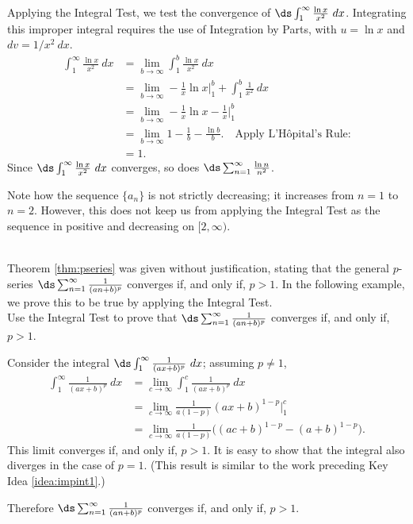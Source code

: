 {Applying the Integral Test, we test the convergence of $\ds \int_1^\infty \frac{\ln x}{x^2}\ dx$. Integrating this improper integral requires the use of Integration by Parts, with $u = \ln x$ and $dv = 1/x^2\ dx$. 
\begin{align*}
\int_1^\infty \frac{\ln x}{x^2}\ dx &= \lim_{b\to\infty} \int_1^b \frac{\ln x}{x^2}\ dx\\
				&= \lim_{b\to\infty} -\frac1x\ln x\Big|_1^b + \int_1^b\frac1{x^2}\ dx \\
				&= \lim_{b\to\infty} -\frac1x\ln x -\frac 1x\Big|_1^b\\
				&= \lim_{b\to\infty}1-\frac1b-\frac{\ln b}{b}.\quad \text{Apply L'H\^opital's Rule:}\\
				&= 1.
\end{align*}
Since $\ds \int_1^\infty \frac{\ln x}{x^2}\ dx$ converges, so does $\ds \sum_{n=1}^\infty \frac{\ln n}{n^2}$.

Note how the sequence $\{a_n\}$ is not strictly decreasing; it increases from $n=1$ to $n=2$. However, this does not keep us from applying the Integral Test as the sequence in positive and decreasing on $[2,\infty)$.
}\\

Theorem \ref{thm:pseries} was given without justification, stating that the general $p$-series $\ds \sum_{n=1}^\infty \frac 1{(an+b)^p}$ converges if, and only if, $p>1$. In the following example, we prove this to be true by applying the Integral Test.\\

{
Use the Integral Test to prove that $\ds \sum_{n=1}^\infty \frac1{(an+b)^p}$ converges if, and only if, $p>1$.
}
{Consider the integral $\ds\int_1^\infty \frac1{(ax+b)^p}\ dx$; assuming $p\neq 1$,
\begin{align*}
\int_1^\infty \frac1{(ax+b)^p}\ dx &= \lim_{c\to\infty} \int_1^c \frac1{(ax+b)^p}\ dx \\
		&= \lim_{c\to\infty} \frac{1}{a(1-p)}(ax+b)^{1-p}\Big|_1^c\\
		&= \lim_{c\to\infty} \frac{1}{a(1-p)}\big((ac+b)^{1-p}-(a+b)^{1-p}\big).
\end{align*}
This limit converges if, and only if, $p>1$. It is easy to show that the integral also diverges in the case of $p=1$. (This result is similar to the work preceding Key Idea \ref{idea:impint1}.)

Therefore $\ds \sum_{n=1}^\infty \frac 1{(an+b)^p}$ converges if, and only if, $p>1$.
}\\

